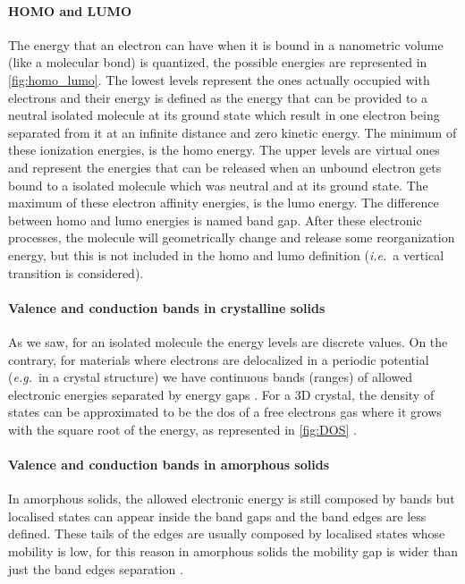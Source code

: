 		\paragraph{HOMO and LUMO}
		The energy that an electron can have when it is bound in a nanometric volume (like a molecular bond) is quantized, the possible energies are represented in \cref{fig:homo_lumo}.
		The lowest levels represent the ones actually occupied with electrons and their energy is defined as the energy that can be provided to a neutral isolated molecule at its ground state which result in one electron being separated from it at an infinite distance and zero kinetic energy.
		The minimum of these ionization energies, is the \gls{homo} energy.
		The upper levels are virtual ones and represent the energies that can be released when an unbound electron gets bound to a isolated molecule which was neutral and at its ground state.
		The maximum of these electron affinity energies, is the \gls{lumo} energy.
		The difference between \gls{homo} and \gls{lumo} energies is named band gap.
		After these electronic processes, the molecule will geometrically change and release some reorganization energy, but this is not included in the \gls{homo} and \gls{lumo} definition (\textsl{i.e.}\ a vertical transition is considered).

		\paragraph{Valence and conduction bands in crystalline solids}
		As we saw, for an isolated molecule the energy levels are discrete values.
		On the contrary, for materials where electrons are delocalized in a periodic potential (\textsl{e.g.}\ in a crystal structure) we have continuous bands (ranges) of allowed electronic energies separated by energy gaps \cite{WikipediaPeriodic}.
		For a 3D crystal, the density of states can be approximated to be the \gls{dos} of a free electrons gas where it grows with the square root of the energy, as represented in \cref{fig:DOS} \cite[140]{Kittel2004}.
		
		\paragraph{Valence and conduction bands in amorphous solids}
		In amorphous solids, the allowed electronic energy is still composed by bands but localised states can appear inside the band gaps and the band edges are less defined.
		These tails of the edges are usually composed by localised states whose mobility is low, for this reason in amorphous solids the mobility gap is wider than just the band edges separation \cite[213]{Stenzel2005}.
		
